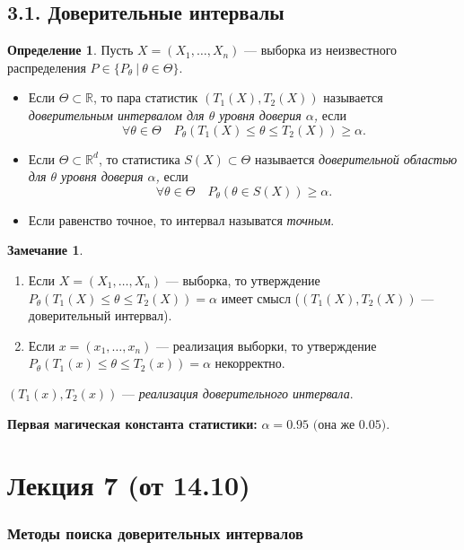 \documentclass[12pt]{report}
\theoremstyle{definition}
\newtheorem{definition}{Определение}
\newtheorem{remark}{Замечание}
\begin{document}
\subsection{3.1. Доверительные интервалы}
\begin{definition}
	Пусть $X = (X_1, \dots, X_n)$ — выборка из неизвестного распределения $P \in \{P_\theta \ \vert \ \theta \in \Theta\}$.
	\begin{itemize}
		\item Если $\Theta \subset \mathbb{R}$, то пара статистик $(T_1(X), T_2(X))$ называется \emph{доверительным интервалом для $\theta$ уровня доверия $\alpha$,} если
		$$\forall \theta \in \Theta \quad P_\theta(T_1(X) \leqslant \theta \leqslant T_2(X) ) \geqslant \alpha.$$

		\item Если $\Theta \subset \mathbb{R}^d$, то статистика $S(X) \subset \Theta$ называется \emph{доверительной областью для $\theta$ уровня доверия $\alpha$,} если
		$$\forall \theta \in \Theta \quad P_\theta(\theta \in S(X) ) \geqslant \alpha. $$
		\item Если равенство точное, то интервал называтся \emph{точным}.
	\end{itemize} 
\end{definition}
\begin{remark}
	\begin{enumerate}
		\item Если $X = (X_1, \dots, X_n)$ — выборка, то утверждение $P_\theta(T_1(X) \leqslant \theta \leqslant T_2(X) ) = \alpha$ имеет смысл ($(T_1(X), T_2(X))$ — доверительный интервал).
		\item Если $x = (x_1, \dots, x_n)$ — реализация выборки, то утверждение $P_\theta(T_1(x) \leqslant \theta \leqslant T_2(x) ) = \alpha$ некорректно.
	\end{enumerate}
	

	$(T_1(x), T_2(x))$ — \emph{реализация доверительного интервала}.
\end{remark}


\textbf{Первая магическая константа статистики:} $\alpha = 0.95 \text{ (она же } 0.05).$

\section{Лекция 7 (от 14.10)}

\subsubsection{Методы поиска доверительных интервалов}
\end{document}
